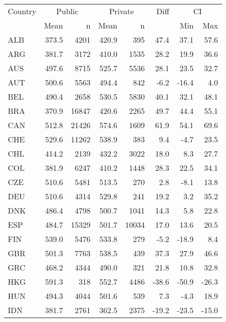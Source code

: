 \begin{table}[ht]
\begin{center}
{\smaller
\begin{tabular}{lrr@{\extracolsep{10pt}}rr@{\extracolsep{10pt}}rrr}
  \hline
  Country & \multicolumn{2}{c}{Public} & \multicolumn{2}{c}{Private} & Diff & \multicolumn{2}{c}{CI} \\ \cline{2-3} \cline{4-5} \cline{7-8} & Mean & n & Mean & n & & Min & Max \\ \hline
ALB & 373.5 & 4201 & 420.9 & 395 & 47.4 & 37.1 & 57.6 \\ 
  ARG & 381.7 & 3172 & 410.0 & 1535 & 28.2 & 19.9 & 36.6 \\ 
  AUS & 497.6 & 8715 & 525.7 & 5536 & 28.1 & 23.5 & 32.7 \\ 
  AUT & 500.6 & 5563 & 494.4 & 842 & -6.2 & -16.4 & 4.0 \\ 
  BEL & 490.4 & 2658 & 530.5 & 5830 & 40.1 & 32.1 & 48.1 \\ 
  BRA & 370.9 & 16847 & 420.6 & 2265 & 49.7 & 44.4 & 55.1 \\ 
  CAN & 512.8 & 21426 & 574.6 & 1609 & 61.9 & 54.1 & 69.6 \\ 
  CHE & 529.6 & 11262 & 538.9 & 383 & 9.4 & -4.7 & 23.5 \\ 
  CHL & 414.2 & 2139 & 432.2 & 3022 & 18.0 & 8.3 & 27.7 \\ 
  COL & 381.9 & 6247 & 410.2 & 1448 & 28.3 & 22.5 & 34.1 \\ 
  CZE & 510.6 & 5481 & 513.5 & 270 & 2.8 & -8.1 & 13.8 \\ 
  DEU & 510.6 & 4314 & 529.8 & 241 & 19.2 & 3.2 & 35.2 \\ 
  DNK & 486.4 & 4798 & 500.7 & 1041 & 14.3 & 5.8 & 22.8 \\ 
  ESP & 484.7 & 15329 & 501.7 & 10034 & 17.0 & 13.6 & 20.5 \\ 
  FIN & 539.0 & 5476 & 533.8 & 279 & -5.2 & -18.9 & 8.4 \\ 
  GBR & 501.3 & 7763 & 538.5 & 439 & 37.3 & 27.9 & 46.6 \\ 
  GRC & 468.2 & 4344 & 490.0 & 321 & 21.8 & 10.8 & 32.8 \\ 
  HKG & 591.3 & 318 & 552.7 & 4486 & -38.6 & -50.9 & -26.3 \\ 
  HUN & 494.3 & 4044 & 501.6 & 539 & 7.3 & -4.3 & 18.9 \\ 
  IDN & 381.7 & 2761 & 362.5 & 2375 & -19.2 & -23.5 & -15.0 \\ 

\end{tabular}}
\end{center}
\end{table}
